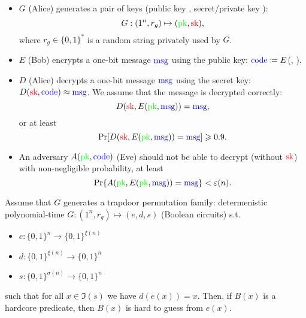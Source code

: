 \newcommand{\sk}{\textcolor{red}{\text{sk}}}
\newcommand{\pk}{\textcolor{green}{\text{pk}}}
\newcommand{\ct}{\textcolor{blue}{\text{code}}}
\newcommand{\m}{\textcolor{blue}{\text{msg}}}
\begin{algorithm}

\begin{itemize}
    \item $G$ (Alice) generates a pair of keys (public key \pk, secret/private key \sk):
    \[
    G: (1^n, r_g) \mapsto (\pk, \sk),
    \]
    where $r_g \in \{0,1\}^*$ is a random string privately used by $G$.
    \item $E$ (Bob) encrypts a one-bit message $\m$ using the public key: $\ct \coloneqq E$(\pk, \m).
    \item $D$ (Alice) decrypts a one-bit message $\m$ using the secret key: $D(\sk, \ct) \approx \m$.
    We assume that the message is decrypted correctly:
    \[
    D(\sk, E(\pk, \m)) = \m,
    \] or at least
    \[
		\Pr[ D(\sk, E(\pk, \m)) = \m ] \geq 0.9.
    \]
	\item An adversary $A(\pk, \ct)$ (Eve) should not be able to decrypt (without $\sk$) with non-negligible probability, at least
    \[
    \Pr\{ A(\pk, E(\pk, \m)) = \m \} < \eps(n).
    \]
\end{itemize}
\end{algorithm}

Assume that $G$ generates a trapdoor permutation family:
determenistic polynomial-time  $G \colon (1^{n}, r_g) \mapsto (e, d, s)$ (Boolean circuits) s.t.
\begin{itemize}
	\item $e \colon \{0,1\}^n \to \{0,1\}^{\xi(n)}$ 
	\item $d \colon \{0,1\}^{\xi(n)} \to \{0,1\}^n$ 
	\item $s \colon \{0,1\}^{\sigma(n)} \to \{0,1\}^n$
\end{itemize}
such that for all $x \in \Im(s)$ we have  $d(e(x)) = x$.
Then, if  $B(x)$ is a hardcore predicate, then  $B(x)$ is hard to guess from  $e(x)$.

